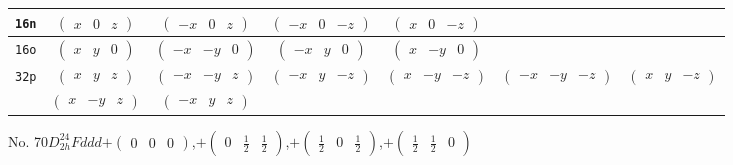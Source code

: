 \documentclass[fleqn,9pt,landscape]{jsarticle}
\begin{document}
\begin{center}
\begin{longtable}{ccccccc}
{\tt 16n} & $ \begin{pmatrix} x & 0 & z \end{pmatrix} $ & $ \begin{pmatrix} - x & 0 & z \end{pmatrix} $ & $ \begin{pmatrix} - x & 0 & - z \end{pmatrix} $ & $ \begin{pmatrix} x & 0 & - z \end{pmatrix} $ & $  $ & $  $ \\ \hline
{\tt 16o} & $ \begin{pmatrix} x & y & 0 \end{pmatrix} $ & $ \begin{pmatrix} - x & - y & 0 \end{pmatrix} $ & $ \begin{pmatrix} - x & y & 0 \end{pmatrix} $ & $ \begin{pmatrix} x & - y & 0 \end{pmatrix} $ & $  $ & $  $ \\ \hline
{\tt 32p} & $ \begin{pmatrix} x & y & z \end{pmatrix} $ & $ \begin{pmatrix} - x & - y & z \end{pmatrix} $ & $ \begin{pmatrix} - x & y & - z \end{pmatrix} $ & $ \begin{pmatrix} x & - y & - z \end{pmatrix} $ & $ \begin{pmatrix} - x & - y & - z \end{pmatrix} $ & $ \begin{pmatrix} x & y & - z \end{pmatrix} $ \\
& $ \begin{pmatrix} x & - y & z \end{pmatrix} $ & $ \begin{pmatrix} - x & y & z \end{pmatrix} $ & $  $ & $  $ & $  $ & $  $ \\
\end{longtable}
\end{center}
\newpage
No. 70\quad$D_{2h}^{24}$\quad$Fddd$\quad[ orthorhombic ]\quad$+\begin{pmatrix} 0 & 0 & 0 \end{pmatrix}$,\quad $+\begin{pmatrix} 0 & \frac{1}{2} & \frac{1}{2} \end{pmatrix}$,\quad $+\begin{pmatrix} \frac{1}{2} & 0 & \frac{1}{2} \end{pmatrix}$,\quad $+\begin{pmatrix} \frac{1}{2} & \frac{1}{2} & 0 \end{pmatrix}$
\end{document}
